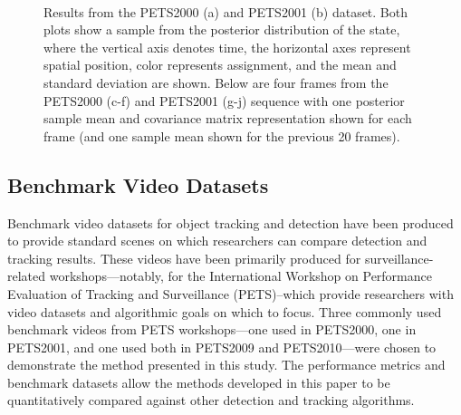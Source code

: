\documentclass[twocolumn, final]{svjour3}
\begin{document}
\begin{figure}[!]
   \\
  \caption{Results from the PETS2000 (a) and PETS2001 (b) dataset. Both plots show a sample from the posterior distribution of the state, where the vertical axis denotes time, the horizontal axes represent spatial position, color represents assignment, and the mean and standard deviation are shown. Below are four frames from the PETS2000 (c-f) and PETS2001 (g-j) sequence with one posterior sample mean and covariance matrix representation shown for each frame (and one sample mean shown for the previous 20 frames).}
  \label{fig:pets2001_overlay}
\end{figure}


\subsection{Benchmark Video Datasets}
\label{sec:benchmarkvideodatasets}

Benchmark video datasets for object tracking and detection have been produced to provide standard scenes on which researchers can compare detection and tracking results. These videos have been primarily produced for surveillance-related workshops---notably, for the International Workshop on Performance Evaluation of Tracking and Surveillance (PETS)--which provide researchers with video datasets and algorithmic goals on which to focus. Three commonly used benchmark videos from PETS workshops---one used in PETS2000, one in PETS2001, and one used both in PETS2009 and PETS2010---were chosen to demonstrate the method presented in this study. The performance metrics and benchmark datasets allow the methods developed in this paper to be quantitatively compared against other detection and tracking algorithms.
\end{document}
